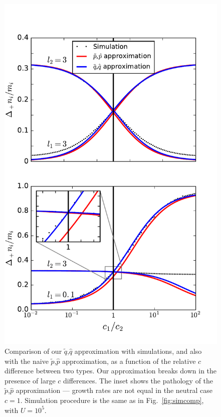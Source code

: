 \documentclass[12pt]{article}
\begin{document}
\begin{figure}
\centering
\includegraphics[scale=0.8]{approx_details.pdf}
\caption{\label{fig:approx_details} Comparison of our $\tilde{q}$,$\hat{q}$ approximation with simulations, and also with the naive $\tilde{p}$,$\hat{p}$ approximation, as a function of the relative $c$ difference between two types. Our approximation breaks down in the presence of large $c$ differences. The inset shows the pathology of the $\tilde{p}$,$\hat{p}$ approximation --- growth rates are not equal in the neutral case $c=1$. Simulation procedure is the same as in Fig.~\ref{fig:simcomp}, with $U=10^5$.}
\end{figure}
\end{document}

